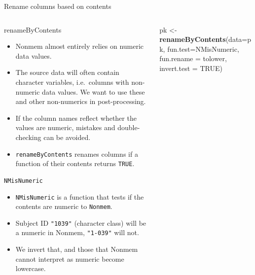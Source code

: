 \documentclass[
  8pt,
  ignorenonframetext,
  aspectratio=169]{beamer}
\newenvironment{Shaded}{\begin{snugshade}}{\end{snugshade}}
\newcommand{\DataTypeTok}[1]{\textcolor[rgb]{0.13,0.29,0.53}{#1}}
\newcommand{\KeywordTok}[1]{\textcolor[rgb]{0.13,0.29,0.53}{\textbf{#1}}}
\newcommand{\NormalTok}[1]{#1}
\newcommand{\OtherTok}[1]{\textcolor[rgb]{0.56,0.35,0.01}{#1}}
\newcommand{\StringTok}[1]{\textcolor[rgb]{0.31,0.60,0.02}{#1}}
\providecommand{\tightlist}{%
  \setlength{\itemsep}{0pt}\setlength{\parskip}{0pt}}
\begin{document}
\begin{frame}[fragile]{Rename columns based on contents}
\protect\hypertarget{rename-columns-based-on-contents}{}
\begin{columns}[T]
\begin{column}{0.48\textwidth}
\begin{block}{renameByContents}
\protect\hypertarget{renamebycontents}{}
\begin{itemize}
\tightlist
\item
  Nonmem almost entirely relies on numeric data values.
\item
  The source data will often contain character variables, i.e.~columns
  with non-numeric data values. We want to use these and other
  non-numerics in post-processing.
\item
  If the column names reflect whether the values are numeric, mistakes
  and double-checking can be avoided.
\item
  \texttt{renameByContents} renames columns if a function of their
  contents returns \texttt{TRUE}.
\end{itemize}
\end{block}

\begin{block}{\texttt{NMisNumeric}}
\protect\hypertarget{nmisnumeric}{}
\begin{itemize}
\tightlist
\item
  \texttt{NMisNumeric} is a function that tests if the contents are
  numeric to \texttt{Nonmem}.
\item
  Subject ID \texttt{"1039"} (character class) will be a numeric in
  Nonmem, \texttt{"1-039"} will not.
\item
  We invert that, and those that Nonmem cannot interpret as numeric
  become lowercase.
\end{itemize}
\end{block}
\end{column}

\begin{column}{0.48\textwidth}
\footnotesize

\begin{Shaded}
\begin{Highlighting}[]
\NormalTok{pk \textless{}{-}}\StringTok{ }\KeywordTok{renameByContents}\NormalTok{(}\DataTypeTok{data=}\NormalTok{pk,}
                       \DataTypeTok{fun.test=}\NormalTok{NMisNumeric,}
                       \DataTypeTok{fun.rename =}\NormalTok{ tolower,}
                       \DataTypeTok{invert.test =} \OtherTok{TRUE}\NormalTok{)}
\end{Highlighting}
\end{Shaded}


\end{column}
\end{columns}
\end{frame}
\end{document}
